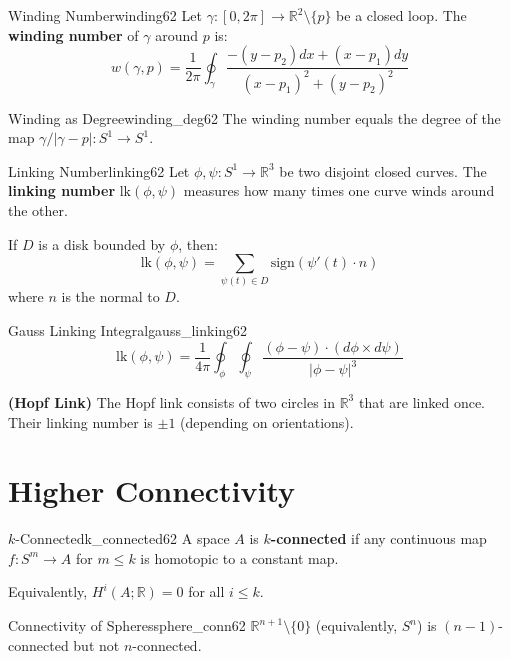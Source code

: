 \documentclass[11pt, letterpaper, openany]{book}
\begin{document}
\begin{defn}{Winding Number}{winding62}
Let $\gamma: [0, 2\pi] \to \mathbb{R}^2 \setminus \{p\}$ be a closed loop. The \textbf{winding number} of $\gamma$ around $p$ is:
\[
w(\gamma, p) = \frac{1}{2\pi} \oint_\gamma \frac{-(y-p_2)dx + (x-p_1)dy}{(x-p_1)^2 + (y-p_2)^2}
\]
\end{defn}

\begin{thm}{Winding as Degree}{winding_deg62}
The winding number equals the degree of the map $\gamma/|\gamma - p|: S^1 \to S^1$.
\end{thm}

\begin{defn}{Linking Number}{linking62}
Let $\phi, \psi: S^1 \to \mathbb{R}^3$ be two disjoint closed curves. The \textbf{linking number} $\text{lk}(\phi, \psi)$ measures how many times one curve winds around the other.

If $D$ is a disk bounded by $\phi$, then:
\[
\text{lk}(\phi, \psi) = \sum_{\psi(t) \in D} \text{sign}(\psi'(t) \cdot n)
\]
where $n$ is the normal to $D$.
\end{defn}

\begin{thm}{Gauss Linking Integral}{gauss_linking62}
\[
\text{lk}(\phi, \psi) = \frac{1}{4\pi} \oint_\phi \oint_\psi \frac{(\phi - \psi) \cdot (d\phi \times d\psi)}{|\phi - \psi|^3}
\]
\end{thm}

\begin{example}
\textbf{(Hopf Link)}
The Hopf link consists of two circles in $\mathbb{R}^3$ that are linked once. Their linking number is $\pm 1$ (depending on orientations).
\end{example}

\section{Higher Connectivity}

\begin{defn}{$k$-Connected}{k_connected62}
A space $A$ is \textbf{$k$-connected} if any continuous map $f: S^m \to A$ for $m \leq k$ is homotopic to a constant map.

Equivalently, $H^i(A; \mathbb{R}) = 0$ for all $i \leq k$.
\end{defn}

\begin{thm}{Connectivity of Spheres}{sphere_conn62}
$\mathbb{R}^{n+1} \setminus \{0\}$ (equivalently, $S^n$) is $(n-1)$-connected but not $n$-connected.
\end{thm}
\end{document}
